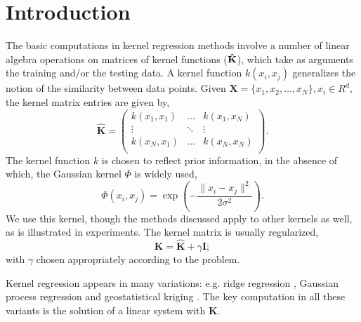 \documentclass[10pt,journal,letterpaper,compsoc]{IEEEtran}
\begin{document}
\maketitle
\IEEEdisplaynotcompsoctitleabstractindextext
\IEEEpeerreviewmaketitle

\section{Introduction}
The basic computations in kernel regression methods involve a number of linear algebra operations on matrices of kernel functions ($\bf \hat{K}$), which take as arguments the training and/or the testing data. A kernel function $k(x_i,x_j)$ generalizes the notion of the similarity between data points. Given $\mathbf{X}=\{x_1,x_2,\ldots,x_N\}, x_i\in R^d$, the kernel matrix entries are given by,
\begin{equation}
\mathbf{\hat{K}} = \left(
  \begin{array}{ccc}
    k(x_1,x_1) & \ldots & k(x_1,x_N)\\
    \vdots & \ddots & \vdots\\
    k(x_N,x_1) & \ldots & k(x_N,x_N)\\
  \end{array}
\right).\label{eq:kernelMatrix}
\end{equation}
The kernel function $k$ is chosen to reflect prior information, in the absence of which, the Gaussian kernel $\Phi$ is widely used,
\begin{equation}
 \Phi(x_i,x_j)=\exp\left(-\frac{\|x_i-x_j\|^2}{2\sigma^2}\right)\label{eq:Gaussian}.
\end{equation}
We use this kernel, though the methods discussed apply to other kernels as well, as is illustrated in experiments. The kernel matrix is usually regularized,
\begin{equation}\mathbf{K}=\mathbf{\hat{K}}+\gamma\mathbf{I};\label{eq:RegKernel}\end{equation}
with $\gamma$ chosen appropriately according to the problem.

Kernel regression appears in many variations: e.g. ridge regression \cite{BishopML}, Gaussian process regression \cite{GPML_Rasmussen} and geostatistical kriging \cite{AppliedGeostatistics}. The key computation in all these variants is the solution of a linear system with $\mathbf{K}$.
\end{document}
